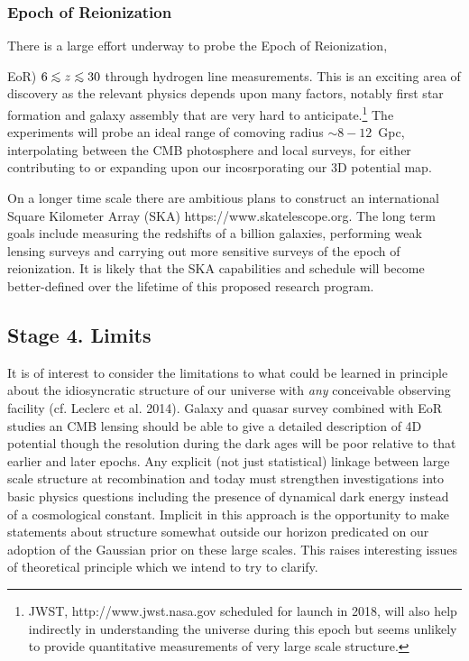\documentclass[psfig,11pt]{article}
\def\lo{\mathrel{\raise.3ex\hbox{$<$}\mkern-14mu\lower0.6ex\hbox{$\sim$}}}
\begin{document}
\subsubsection{Epoch of Reionization}

There is a large effort underway to probe the Epoch of Reionization, {EoR) $6\lo z\lo30$ through hydrogen line measurements. This is an exciting area of discovery as the relevant physics depends upon many factors, notably first star formation and galaxy assembly that are very hard to anticipate.\footnote{JWST, http://www.jwst.nasa.gov scheduled for launch in 2018, will also help indirectly in understanding the universe during this epoch but seems unlikely to provide quantitative measurements of very large scale structure.} The experiments will probe an ideal range of comoving radius $\sim8-12$~Gpc, interpolating between the CMB photosphere and local surveys,  for either contributing to or expanding upon our incosrporating our 3D potential map.

On a longer time scale there are ambitious plans to construct an international Square Kilometer Array (SKA) https://www.skatelescope.org. The long term goals include measuring the redshifts of a billion galaxies, performing weak lensing surveys and carrying out more sensitive surveys of the epoch of reionization. It is likely that the SKA capabilities and schedule will become better-defined over the lifetime of this proposed research program.

\subsection{Stage 4. Limits}

It is of interest to consider the limitations to what could be learned in principle about the idiosyncratic structure of our universe with {\it any} conceivable observing facility (cf. Leclerc et al. 2014). Galaxy and quasar survey combined with EoR studies an CMB lensing should be able to give a detailed description of 4D potential though the resolution during the dark ages will be poor relative to that earlier and later epochs. Any explicit (not just statistical) linkage between large scale structure at recombination and today must strengthen investigations into basic physics questions including the presence of dynamical dark energy instead of a cosmological constant. Implicit in this approach is the opportunity to make statements about structure somewhat outside our horizon predicated on our adoption of the Gaussian prior on these large scales. This raises interesting issues of theoretical principle which we intend to try to clarify.%

}
\end{document}
